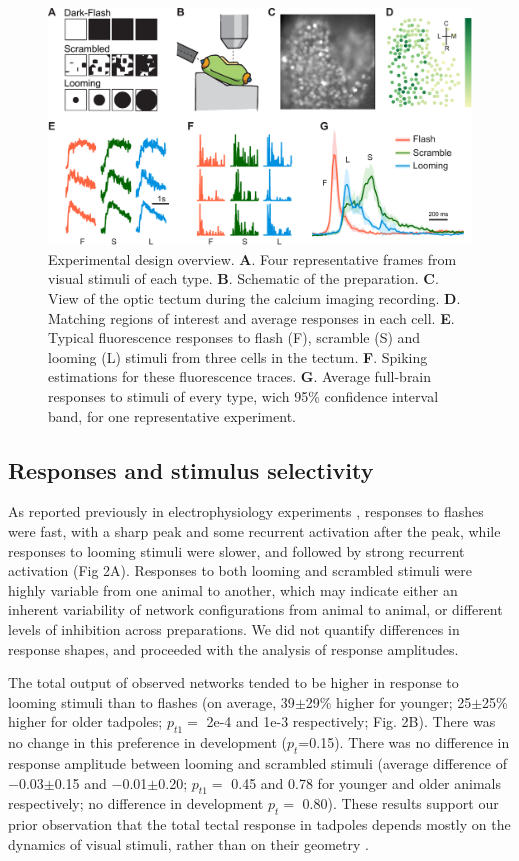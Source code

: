 \documentclass{article}
\begin{document}
\begin{figure}[t]
\includegraphics[width=\linewidth]{fig1.pdf}
\caption{
Experimental design overview. \textbf{A}. Four representative frames from visual stimuli of each type. \textbf{B}. Schematic of the preparation. \textbf{C}. View of the optic tectum during the calcium imaging recording. \textbf{D}. Matching regions of interest and average responses in each cell. \textbf{E}. Typical fluorescence responses to flash (F), scramble (S) and looming (L) stimuli from three cells in the tectum. \textbf{F}. Spiking estimations for these fluorescence traces. \textbf{G}. Average full-brain responses to stimuli of every type, wich 95\% confidence interval band, for one representative experiment. }
\end{figure}

\subsection*{Responses and stimulus selectivity}

As reported previously in electrophysiology experiments \citep{khakhalin2014}, responses to flashes were fast, with a sharp peak and some recurrent activation after the peak, while responses to looming stimuli were slower, and followed by strong recurrent activation (Fig 2A). Responses to both looming and scrambled stimuli were highly variable from one animal to another, which may indicate either an inherent variability of network configurations from animal to animal, or different levels of inhibition across preparations. We did not quantify differences in response shapes, and proceeded with the analysis of response amplitudes.

The total output of observed networks tended to be higher in response to looming stimuli than to flashes (on average, 39$\pm$29\% higher for younger; 25$\pm$25\% higher for older tadpoles; $p_{t1}=$ 2e-4 and 1e-3 respectively; Fig. 2B). There was no change in this preference in development ($p_t$=0.15). There was no difference in response amplitude between looming and scrambled stimuli (average difference of $-$0.03$\pm$0.15 and $-$0.01$\pm$0.20; $p_{t1}=$ 0.45 and 0.78 for younger and older animals respectively; no difference in development $p_t=$ 0.80). These results support our prior observation that the total tectal response in tadpoles depends mostly on the dynamics of visual stimuli, rather than on their geometry \citep{khakhalin2014,jang2016}.
\end{document}
